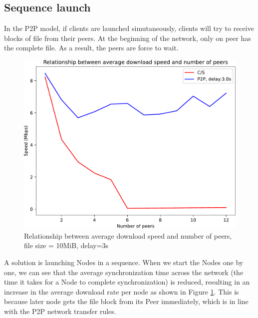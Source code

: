 \subsection{Sequence launch}
In the P2P model, if clients are launched simutaneously, clients will try to receive blocks of file from their peers. At the beginning of the network, only on peer has the complete file. As a result, the peers are force to wait.


\begin{figure}[H]
	\centering
	\includegraphics[scale=0.6]{img/graphdelay}
	\caption{Relationship between average download speed and number of peers, file size = 10MiB, delay=3s}
	\label{graphdelay}
\end{figure}

A solution is launching Nodes in a sequence. When we start the Nodes one by one, we can see that the average synchronization time across the network (the time it takes for a Node to complete synchronization) is reduced, resulting in an increase in the average download rate per node as shown in Figure \ref{graphdelay}. This is because later node gets the file block from its Peer immediately, which is in line with the P2P network transfer rules.

